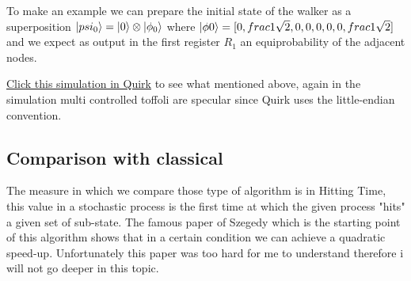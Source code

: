 To make an example we can prepare the initial state of the walker as a superposition $\ket{psi_{0}} = \ket{0} \otimes \ket{\phi_{0}}$
where $\ket{\phi{0}} = [0, frac{1}{\sqrt{2}}, 0 , 0, 0, 0, 0, frac{1}{\sqrt{2}}]$ and we expect as output in the first register $R_{1}$ an equiprobability of the adjacent nodes.

\href{https://bit.ly/31hCZ1n}{Click this simulation in Quirk} 
to see what mentioned above, again in the simulation multi controlled toffoli are specular since Quirk uses the little-endian convention.

\subsection{Comparison with classical}

The measure in which we compare those type of algorithm is in Hitting Time, this value in a stochastic process is the first time 
at which the given process "hits" a given set of sub-state. The famous paper of Szegedy \cite{1366222} which is the starting point of this
algorithm shows that in a certain condition we can achieve a quadratic speed-up. Unfortunately this paper was too hard for me to understand 
therefore i will not go deeper in this topic. 
